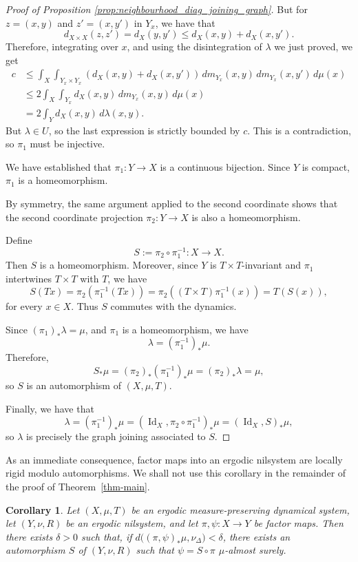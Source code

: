 \documentclass[12pt]{amsart}
\theoremstyle{plain}
\newtheorem{corollary}[theorem]{Corollary}
\theoremstyle{definition}
\DeclareMathOperator{\Id}{Id}
\begin{document}
\begin{proof}[Proof of Proposition \ref{prop:neighbourhood_diag_joining_graph}]
    But for $z = (x,y)$ and $z' = (x,y')$ in $Y_x$, we have that 
    \[
    d_{X \times X}(z, z') = d_X(y,y') \leq d_X(x,y) + d_X(x,y').
    \]
    Therefore, integrating over $x$, and using the disintegration of $\lambda$ we just proved, we get  
    \begin{align*}
        c &\leq 
        \int_X \int_{Y_x \times Y_x} (d_X(x,y) + d_X(x,y')) \,d m_{Y_x}(x,y) \,d m_{Y_x}(x,y') \,d\mu(x) \\
        &\leq 2 \int_X \int_{Y_x} d_X(x,y) \,d m_{Y_x}(x,y) \,d\mu(x) \\
        &= 2 \int_Y d_X(x,y) \,d\lambda(x,y).
    \end{align*}
    But $\lambda \in U$, so the last expression is strictly bounded by $c$. 
    This is a contradiction, so $\pi_1$ must be injective. 

    We have established that $\pi_1 \colon Y \to X$ is a continuous bijection.
    Since $Y$ is compact, $\pi_1$ is a homeomorphism.

    By symmetry, the same argument applied to the second coordinate shows  that the second coordinate projection $\pi_2 \colon Y \to X$ is also a homeomorphism. 

    Define 
    \[
    S := \pi_2 \circ \pi_1^{-1} \colon X \to X.
    \]
    Then $S$ is a homeomorphism.
    Moreover, since $Y$ is $T \times T$-invariant and $\pi_1$ intertwines $T \times T$ with $T$, we have 
    \[
    S(Tx) = \pi_2(\pi_1^{-1}(Tx)) = \pi_2((T \times T) \pi_1^{-1}(x)) = T(S(x)),
    \]
    for every $x \in X$.
    Thus $S$ commutes with the dynamics. 

    Since $(\pi_1)_* \lambda = \mu$, and $\pi_1$ is a homeomorphism, we have 
    \[
    \lambda = (\pi_1^{-1})_* \mu.
    \]
    Therefore, 
    \[
    S_* \mu = (\pi_2)_* (\pi_1^{-1})_* \mu = (\pi_2)_* \lambda = \mu,
    \]
    so $S$ is an automorphism of $(X, \mu, T)$.

    Finally, we have that 
    \[
    \lambda = (\pi_1^{-1})_* \mu = (\Id_X, \pi_2 \circ \pi_1^{-1})_* \mu = (\Id_X, S)_* \mu, 
    \]
    so $\lambda$ is precisely the graph joining associated to $S$.
\end{proof}

As an immediate consequence, factor maps into an ergodic nilsystem are locally rigid modulo automorphisms. We shall not use this corollary in the remainder of the proof of Theorem~\ref{thm-main}.

\begin{corollary}\label{cor:local_rigidity_factor_maps}
Let $(X,\mu,T)$ be an ergodic measure-preserving dynamical system, let
$(Y,\nu,R)$ be an ergodic nilsystem, and let $\pi,\psi \colon X \to Y$ 
be factor maps. Then there exists $\delta>0$
such that, if $d\bigl((\pi,\psi)_*\mu,\nu_\Delta\bigr)<\delta$, there exists an automorphism $S$ of $(Y,\nu,R)$ such that $\psi = S \circ \pi$ $\mu$-almost surely. 
\end{corollary}
\end{document}
